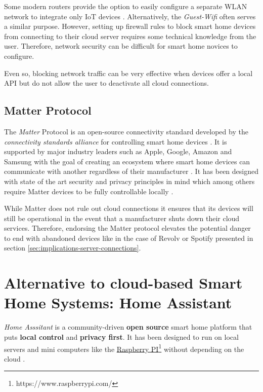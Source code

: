 Some modern routers provide the option to easily configure a separate WLAN network to integrate only IoT devices \cite{BMI-SmartHomeSecurity}. Alternatively, the \textit{Guest-Wifi} often serves a similar purpose. However, setting up firewall rules to block smart home devices from connecting to their cloud server requires some technical knowledge from the user. Therefore, network security can be difficult for smart home novices to configure.

Even so, blocking network traffic can be very effective when devices offer a local API but do not allow the user to deactivate all cloud connections.

\subsection{Matter Protocol}
The \textit{Matter} Protocol is an open-source connectivity standard developed by the \textit{connectivity standards alliance} for controlling smart home devices \cite{Matter-Security&Privacy}. It is supported by major industry leaders such as Apple, Google, Amazon and Samsung with the goal of creating an ecosystem where smart home devices can communicate with another regardless of their manufacturer \cite{Matter-10288747}. It has been designed with state of the art security and privacy principles in mind which among others require Matter devices to be fully controllable locally \cite{Matter-Security&Privacy}.

While Matter does not rule out cloud connections \cite{Matter-Security&Privacy} it ensures that its devices will still be operational in the event that a manufacturer shuts down their cloud services. Therefore, endorsing the Matter protocol elevates the potential danger to end with abandoned devices like in the case of Revolv or Spotify presented in section \ref{sec:implications-server-connections}.

\newpage


\section{Alternative to cloud-based Smart Home Systems: Home Assistant} \label{sec:Home Assistant}
\textit{Home Asssitant} is a community-driven \textbf{open source} smart home platform that puts \textbf{local control} and \textbf{privacy first}. It has been designed to run on local servers and mini computers like the \href{https://www.raspberrypi.com/}{Raspberry PI}\footnote{https://www.raspberrypi.com/} without depending on the cloud \cite{HomeAssistant_Startpage}.

